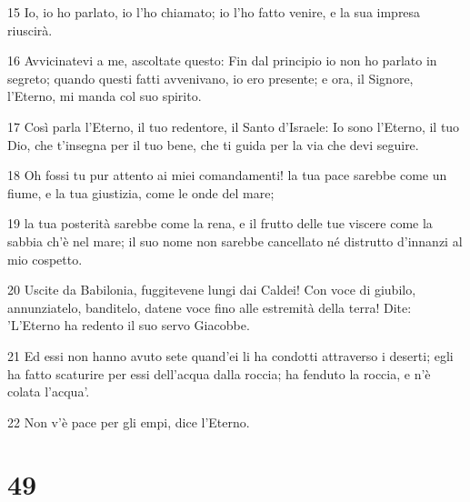 \par 15 Io, io ho parlato, io l'ho chiamato; io l'ho fatto venire, e la sua impresa riuscirà.
\par 16 Avvicinatevi a me, ascoltate questo: Fin dal principio io non ho parlato in segreto; quando questi fatti avvenivano, io ero presente; e ora, il Signore, l'Eterno, mi manda col suo spirito.
\par 17 Così parla l'Eterno, il tuo redentore, il Santo d'Israele: Io sono l'Eterno, il tuo Dio, che t'insegna per il tuo bene, che ti guida per la via che devi seguire.
\par 18 Oh fossi tu pur attento ai miei comandamenti! la tua pace sarebbe come un fiume, e la tua giustizia, come le onde del mare;
\par 19 la tua posterità sarebbe come la rena, e il frutto delle tue viscere come la sabbia ch'è nel mare; il suo nome non sarebbe cancellato né distrutto d'innanzi al mio cospetto.
\par 20 Uscite da Babilonia, fuggitevene lungi dai Caldei! Con voce di giubilo, annunziatelo, banditelo, datene voce fino alle estremità della terra! Dite: 'L'Eterno ha redento il suo servo Giacobbe.
\par 21 Ed essi non hanno avuto sete quand'ei li ha condotti attraverso i deserti; egli ha fatto scaturire per essi dell'acqua dalla roccia; ha fenduto la roccia, e n'è colata l'acqua'.
\par 22 Non v'è pace per gli empi, dice l'Eterno.

\chapter{49}

